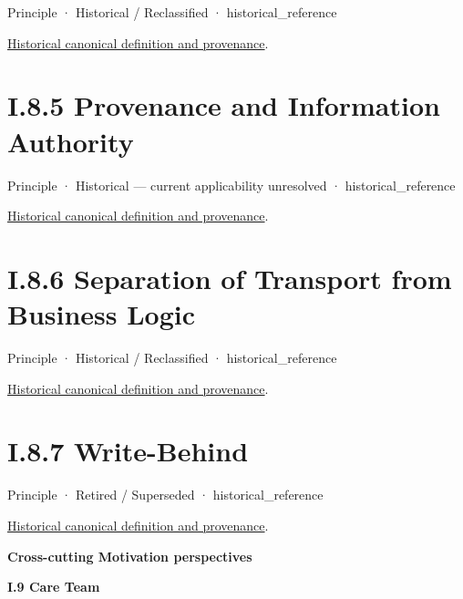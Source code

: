 \label{element:96ed278624c34ba4bfade0df08d45d74}
{\small Principle · Historical / Reclassified · historical\_reference}\par
\href{../../../../continuum/motivation/principle/96ed278624c34ba4bfade0df08d45d74.md}{Historical canonical definition and provenance}.\par
\section*{I.8.5 Provenance and Information Authority}
\label{navigation:I.8.5}

\label{element:638c501ba4df4c67aee92d1f328aad84}
{\small Principle · Historical — current applicability unresolved · historical\_reference}\par
\href{../../../../continuum/motivation/principle/638c501ba4df4c67aee92d1f328aad84.md}{Historical canonical definition and provenance}.\par
\section*{I.8.6 Separation of Transport from Business Logic}
\label{navigation:I.8.6}

\label{element:5ae28648334e4f6184044af0462eb9a8}
{\small Principle · Historical / Reclassified · historical\_reference}\par
\href{../../../../continuum/motivation/principle/5ae28648334e4f6184044af0462eb9a8.md}{Historical canonical definition and provenance}.\par
\section*{I.8.7 Write-Behind}
\label{navigation:I.8.7}

\label{element:a5dffc0325d44915971eea600bba48f1}
{\small Principle · Retired / Superseded · historical\_reference}\par
\href{../../../../continuum/motivation/principle/a5dffc0325d44915971eea600bba48f1.md}{Historical canonical definition and provenance}.\par
\clearpage\textbf{Cross-cutting Motivation perspectives}\par
\par\medskip{}\label{navigation:I.9}
\textbf{I.9 Care Team}\par


